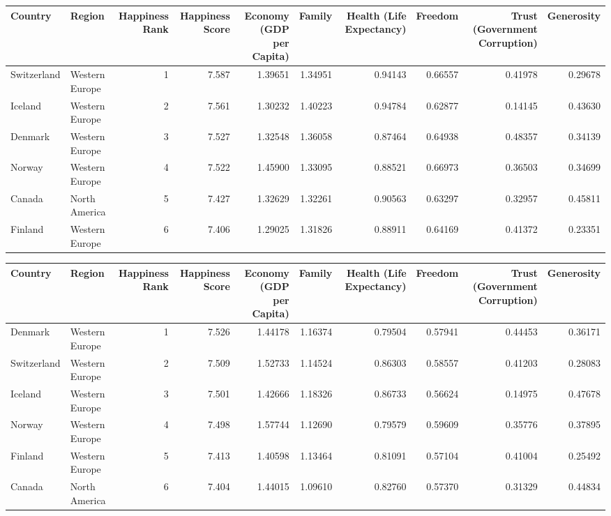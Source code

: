 \documentclass[]{article}
\newenvironment{Shaded}{\begin{snugshade}}{\end{snugshade}}
\newcommand{\DataTypeTok}[1]{\textcolor[rgb]{0.13,0.29,0.53}{#1}}
\newcommand{\KeywordTok}[1]{\textcolor[rgb]{0.13,0.29,0.53}{\textbf{#1}}}
\newcommand{\NormalTok}[1]{#1}
\newcommand{\OperatorTok}[1]{\textcolor[rgb]{0.81,0.36,0.00}{\textbf{#1}}}
\newcommand{\StringTok}[1]{\textcolor[rgb]{0.31,0.60,0.02}{#1}}
\begin{document}
\begin{longtable}[]{@{}llrrrrrrrr@{}}
\toprule
Country & Region & Happiness Rank & Happiness Score & Economy (GDP per
Capita) & Family & Health (Life Expectancy) & Freedom & Trust
(Government Corruption) & Generosity\tabularnewline
\midrule
\endhead
Switzerland & Western Europe & 1 & 7.587 & 1.39651 & 1.34951 & 0.94143 &
0.66557 & 0.41978 & 0.29678\tabularnewline
Iceland & Western Europe & 2 & 7.561 & 1.30232 & 1.40223 & 0.94784 &
0.62877 & 0.14145 & 0.43630\tabularnewline
Denmark & Western Europe & 3 & 7.527 & 1.32548 & 1.36058 & 0.87464 &
0.64938 & 0.48357 & 0.34139\tabularnewline
Norway & Western Europe & 4 & 7.522 & 1.45900 & 1.33095 & 0.88521 &
0.66973 & 0.36503 & 0.34699\tabularnewline
Canada & North America & 5 & 7.427 & 1.32629 & 1.32261 & 0.90563 &
0.63297 & 0.32957 & 0.45811\tabularnewline
Finland & Western Europe & 6 & 7.406 & 1.29025 & 1.31826 & 0.88911 &
0.64169 & 0.41372 & 0.23351\tabularnewline
\bottomrule
\end{longtable}

\begin{Shaded}
\end{Shaded}

\begin{longtable}[]{@{}llrrrrrrrr@{}}
\toprule
Country & Region & Happiness Rank & Happiness Score & Economy (GDP per
Capita) & Family & Health (Life Expectancy) & Freedom & Trust
(Government Corruption) & Generosity\tabularnewline
\midrule
\endhead
Denmark & Western Europe & 1 & 7.526 & 1.44178 & 1.16374 & 0.79504 &
0.57941 & 0.44453 & 0.36171\tabularnewline
Switzerland & Western Europe & 2 & 7.509 & 1.52733 & 1.14524 & 0.86303 &
0.58557 & 0.41203 & 0.28083\tabularnewline
Iceland & Western Europe & 3 & 7.501 & 1.42666 & 1.18326 & 0.86733 &
0.56624 & 0.14975 & 0.47678\tabularnewline
Norway & Western Europe & 4 & 7.498 & 1.57744 & 1.12690 & 0.79579 &
0.59609 & 0.35776 & 0.37895\tabularnewline
Finland & Western Europe & 5 & 7.413 & 1.40598 & 1.13464 & 0.81091 &
0.57104 & 0.41004 & 0.25492\tabularnewline
Canada & North America & 6 & 7.404 & 1.44015 & 1.09610 & 0.82760 &
0.57370 & 0.31329 & 0.44834\tabularnewline
\bottomrule
\end{longtable}
\end{document}
